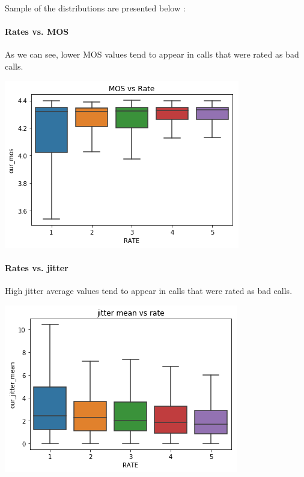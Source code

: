 Sample of the distributions are presented below :

\paragraph{Rates vs. MOS}\label{rates-vs.-jitter}

As we can see, lower MOS values tend to appear in calls that were rated
as bad calls.

\begin{center}
\includegraphics{figures/output_23_0.png}
\end{center}

\paragraph{Rates vs. jitter}\label{rates-vs.-jitter}

High jitter average values tend to appear in calls that were rated as
bad calls.

\begin{center}
\includegraphics{figures/output_25_0.png}
\end{center}
    
